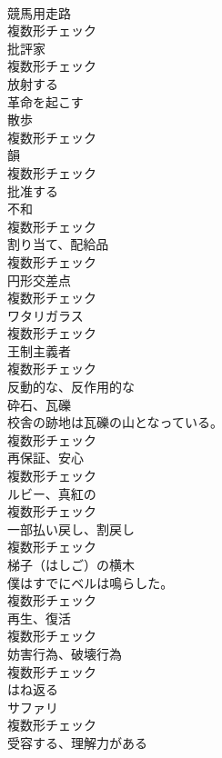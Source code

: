 \documentclass[8pt]{extreport}
\begin{document}
\begin{CJK}{UTF8}{min}
\\	[名詞]	競馬用走路	
\\	複数形チェック
\\	[名詞]	批評家	
\\	複数形チェック
\\	[動詞]	放射する	
\\	[動詞]	革命を起こす	
\\	[名詞]	散歩	
\\	複数形チェック
\\	[名詞]	韻	
\\	複数形チェック
\\	[動詞]	批准する	
\\	[名詞]	不和	
\\	複数形チェック
\\	[名詞]	割り当て、配給品	
\\	複数形チェック
\\	[名詞]	円形交差点	
\\	複数形チェック
\\	[名詞]	ワタリガラス	
\\	複数形チェック
\\	[名詞]	王制主義者	
\\	複数形チェック
\\	[形容詞]	反動的な、反作用的な	
\\	[名詞]	砕石、瓦礫	
\\	校舎の跡地は瓦礫の山となっている。	
\\	複数形チェック
\\	[名詞]	再保証、安心	
\\	複数形チェック
\\	[名詞]	ルビー、真紅の	
\\	複数形チェック
\\	[名詞]	一部払い戻し、割戻し	
\\	複数形チェック
\\	[名詞]	梯子（はしご）の横木	
\\	僕はすでにベルは鳴らした。	
\\	複数形チェック
\\	[名詞]	再生、復活	
\\	複数形チェック
\\	[名詞]	妨害行為、破壊行為	
\\	複数形チェック
\\	[動詞]	はね返る	
\\	[名詞]	サファリ	
\\	複数形チェック
\\	[形容詞]	受容する、理解力がある	

\end{CJK}
\end{document}
